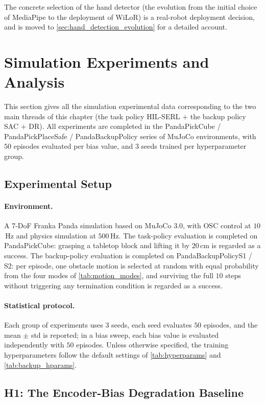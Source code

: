The concrete selection of the hand detector (the evolution from the initial choice of MediaPipe to the deployment of WiLoR) is a real-robot deployment decision, and is moved to \cref{sec:hand_detection_evolution} for a detailed account.

\section{Simulation Experiments and Analysis}\label{sec:sim_experiments}

This section gives all the simulation experimental data corresponding to the two main threads of this chapter (the task policy HIL-SERL $+$ the backup policy SAC $+$ DR). All experiments are completed in the PandaPickCube / PandaPickPlaceSafe / PandaBackupPolicy series of MuJoCo environments, with $50$ episodes evaluated per bias value, and $3$ seeds trained per hyperparameter group.

\subsection{Experimental Setup}\label{sec:sim_exp_setup}

\paragraph{Environment.} A 7-DoF Franka Panda simulation based on MuJoCo 3.0, with OSC control at $10$\,Hz and physics simulation at $500$\,Hz. The task-policy evaluation is completed on PandaPickCube: grasping a tabletop block and lifting it by $20$\,cm is regarded as a success. The backup-policy evaluation is completed on PandaBackupPolicyS1 / S2: per episode, one obstacle motion is selected at random with equal probability from the four modes of \cref{tab:motion_modes}, and surviving the full $10$ steps without triggering any termination condition is regarded as a success.

\paragraph{Statistical protocol.} Each group of experiments uses $3$ seeds, each seed evaluates $50$ episodes, and the mean $\pm$ std is reported; in a bias sweep, each bias value is evaluated independently with $50$ episodes. Unless otherwise specified, the training hyperparameters follow the default settings of \cref{tab:hyperparams} and \cref{tab:backup_hparams}.

\subsection{H1: The Encoder-Bias Degradation Baseline}\label{sec:exp_h1}

